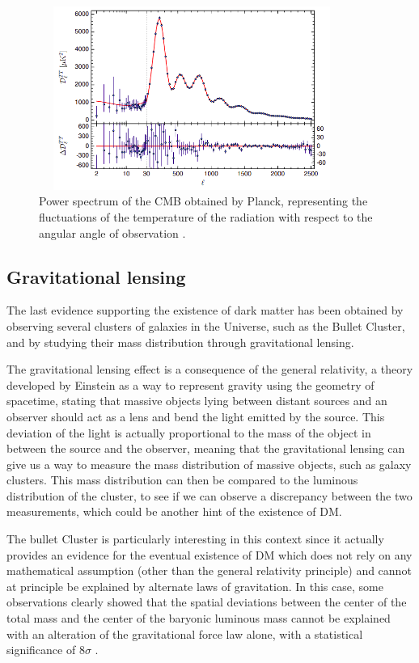 \documentclass[a4paper, 10pt, openright]{report}
\begin{document}
\begin{figure}[htbp]
\begin{center}
\includegraphics[width=10cm, height=6cm]{figs/PlanckSpectrum.png}
\caption{Power spectrum of the \ac{CMB} obtained by Planck, representing the fluctuations of the temperature of the radiation with respect to the angular angle of observation \cite{Planck}.}
\label{figure:CMBSpectrum}
\end{center}
\end{figure}

\subsection{Gravitational lensing}

The last evidence supporting the existence of dark matter has been obtained by observing several clusters of galaxies in the Universe, such as the Bullet Cluster, and by studying their mass distribution through gravitational lensing.

The gravitational lensing effect is a consequence of the general relativity, a theory developed by Einstein as a way to represent gravity using the geometry of spacetime, stating that massive objects lying between distant sources and an observer should act as a lens and bend the light emitted by the source. This deviation of the light is actually proportional to the mass of the object in between the source and the observer, meaning that the gravitational lensing can give us a way to measure the mass distribution of massive objects, such as galaxy clusters. This mass distribution can then be compared to the luminous distribution of the cluster, to see if we can observe a discrepancy between the two measurements, which could be another hint of the existence of \ac{DM}.

The bullet Cluster is particularly interesting in this context since it actually provides an evidence for the eventual existence of \ac{DM} which does not rely on any mathematical assumption (other than the general relativity principle) and cannot at principle be explained by alternate laws of gravitation. In this case, some observations clearly showed that the spatial deviations between the center of the total mass and the center of the baryonic luminous mass cannot be explained with an alteration of the gravitational force law alone, with a statistical significance of $8 \sigma$ \cite{BulletClusterSigma}.
\end{document}
